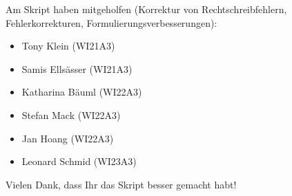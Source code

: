 Am Skript haben mitgeholfen
(Korrektur von Rechtschreibfehlern, Fehlerkorrekturen, Formulierungsverbesserungen):
\begin{itemize}
\item Tony Klein (WI21A3)
\item Samis Ellsässer (WI21A3)
\item Katharina Bäuml (WI22A3)
\item Stefan Mack (WI22A3)
\item Jan Hoang (WI22A3)
\item Leonard Schmid (WI23A3)
\end{itemize}
Vielen Dank, dass Ihr das Skript besser gemacht habt!
